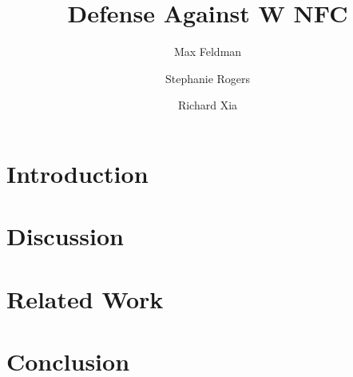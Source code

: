 \documentclass[12pt]{article}
\begin{document}
\title{Defense Against W NFC}
\author{Max Feldman \and Stephanie Rogers \and Richard Xia}
\maketitle

\section{Introduction}
\section{Discussion}
\section{Related Work}
\section{Conclusion}
\end{document}
